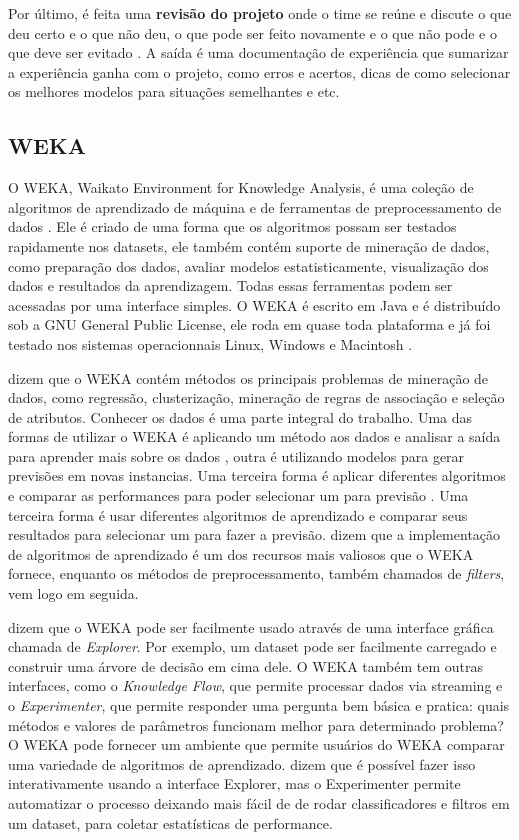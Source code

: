 Por último, é feita uma \textbf{revisão do projeto} onde o time se reúne e discute o que deu certo e o que não deu, o que pode ser feito novamente e o que não pode e o que deve ser evitado \citep{dmfd}.
A saída é uma documentação de experiência que sumarizar a experiência ganha com o projeto, como erros e acertos, dicas de como selecionar os melhores modelos para situações semelhantes e etc.

\subsection{WEKA}

O WEKA, Waikato Environment for Knowledge Analysis, é uma coleção de algoritmos de aprendizado de máquina e de ferramentas de preprocessamento de dados \citep{weka}. Ele é criado de uma forma que os algoritmos possam ser testados rapidamente nos datasets, ele também contém suporte de mineração de dados, como preparação dos dados, avaliar modelos estatisticamente, visualização dos dados e resultados da aprendizagem. Todas essas ferramentas podem ser acessadas por uma interface simples. O WEKA é escrito em Java e é distribuído sob a GNU General Public License, ele roda em quase toda plataforma e já foi testado nos sistemas operacionnais Linux, Windows e Macintosh \citep{weka}.

 dizem que o WEKA contém métodos os principais problemas de mineração de dados, como regressão, clusterização, mineração de regras de associação e seleção de atributos. Conhecer os dados é uma parte integral do trabalho. Uma das formas de utilizar o WEKA é aplicando um método aos dados e analisar a saída para aprender mais sobre os dados \citep{weka}, outra é utilizando modelos para gerar previsões em novas instancias. Uma terceira forma é aplicar diferentes algoritmos e comparar as performances para poder selecionar um para previsão . Uma terceira forma é usar diferentes algoritmos de aprendizado e comparar seus resultados para selecionar um para fazer a previsão.  dizem que a implementação de algoritmos de aprendizado é um dos recursos mais valiosos que o WEKA fornece, enquanto os métodos de preprocessamento, também chamados de \textit{filters}, vem logo em seguida. 

 dizem que o WEKA pode ser facilmente usado através de uma interface gráfica chamada de \textit{Explorer}. Por exemplo, um dataset pode ser facilmente carregado e construir uma árvore de decisão em cima dele. O WEKA também tem outras interfaces, como o \textit{Knowledge Flow}, que permite processar dados via streaming e o \textit{Experimenter}, que permite responder uma pergunta bem básica e pratica: quais métodos e valores de parâmetros funcionam melhor para determinado problema? O WEKA pode fornecer um ambiente que permite usuários do WEKA comparar uma variedade de algoritmos de aprendizado.  dizem que é possível fazer isso interativamente usando a  interface Explorer, mas o Experimenter permite automatizar o processo deixando mais fácil de de rodar classificadores e filtros em um dataset, para coletar estatísticas de performance.

